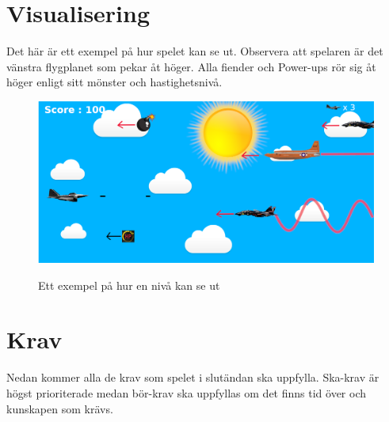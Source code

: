 \documentclass{TDP005mall}
\begin{document}
\section{Visualisering}
Det här är ett exempel på hur spelet kan se ut. Observera att spelaren är det vänstra flygplanet som pekar åt höger. Alla fiender och Power-ups rör sig åt höger enligt sitt mönster och hastighetsnivå. 

\begin{figure}[h!]
  \centering
  \includegraphics[scale=0.35]{Images/Game.png}
  \label{Bild 3}
  \caption{Ett exempel på hur en nivå kan se ut}
\end{figure}


\section{Krav}
Nedan kommer alla de krav som spelet i slutändan ska uppfylla. Ska-krav är högst prioriterade medan bör-krav ska uppfyllas om det finns tid över och kunskapen som krävs.
\end{document}
